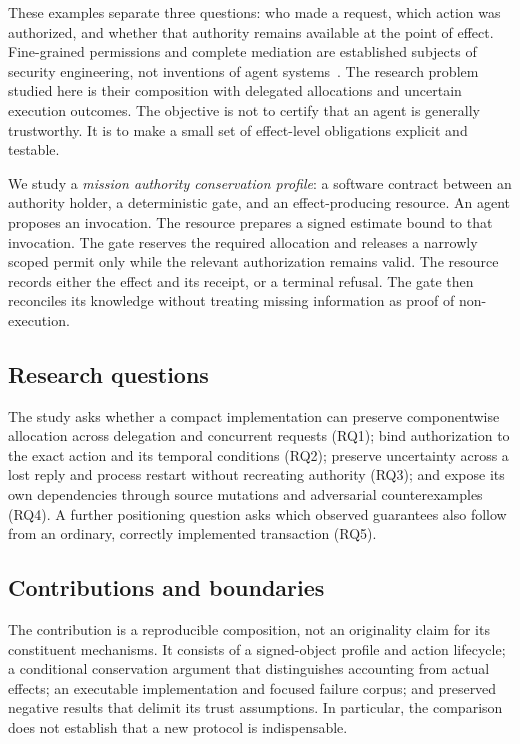 \documentclass[10pt,journal,a4paper]{IEEEtran}
\begin{document}
These examples separate three questions: who made a request, which action was authorized, and whether that authority remains available at the point of effect. Fine-grained permissions and complete mediation are established subjects of security engineering, not inventions of agent systems~\cite{saltzer1975,rar}. The research problem studied here is their composition with delegated allocations and uncertain execution outcomes. The objective is not to certify that an agent is generally trustworthy. It is to make a small set of effect-level obligations explicit and testable.

We study a \emph{mission authority conservation profile}: a software contract between an authority holder, a deterministic gate, and an effect-producing resource. An agent proposes an invocation. The resource prepares a signed estimate bound to that invocation. The gate reserves the required allocation and releases a narrowly scoped permit only while the relevant authorization remains valid. The resource records either the effect and its receipt, or a terminal refusal. The gate then reconciles its knowledge without treating missing information as proof of non-execution.

\subsection{Research questions}
The study asks whether a compact implementation can preserve componentwise allocation across delegation and concurrent requests (RQ1); bind authorization to the exact action and its temporal conditions (RQ2); preserve uncertainty across a lost reply and process restart without recreating authority (RQ3); and expose its own dependencies through source mutations and adversarial counterexamples (RQ4). A further positioning question asks which observed guarantees also follow from an ordinary, correctly implemented transaction (RQ5).

\subsection{Contributions and boundaries}
The contribution is a reproducible composition, not an originality claim for its constituent mechanisms. It consists of a signed-object profile and action lifecycle; a conditional conservation argument that distinguishes accounting from actual effects; an executable implementation and focused failure corpus; and preserved negative results that delimit its trust assumptions. In particular, the comparison does not establish that a new protocol is indispensable.
\end{document}
